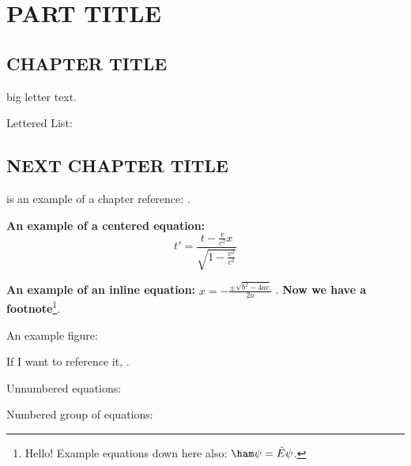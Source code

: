 \section{PART TITLE}

\subsection{CHAPTER TITLE} \label{sec:I}

 big letter text. \lipsum[5] 

Lettered List: 


\subsection{NEXT CHAPTER TITLE}

 is an example of a chapter reference: . \lipsum[1]

\lipsum[2-2] \textbf{An example of a centered equation:} \[
    t' = \frac{t - \frac{v}{c^2}x}{\sqrt{1 - \frac{v^2}{c^2}}}
\]

\lipsum[3-3] \textbf{An example of an inline equation:} $x = -\frac{\pm \sqrt{b^2 - 4ac}}{2a}$ \lipsum[4-4]. \textbf{Now we have a footnote}\footnote{Hello! Example equations down here also: $\ham \psi = \hat{E}\psi$.}.

An example figure: 

If I want to reference it, .

Unnumbered equations:

Numbered group of equations:
